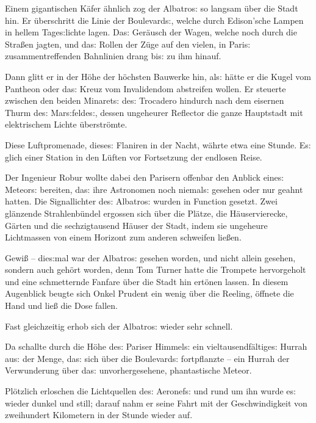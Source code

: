\documentclass[oneside,12pt]{book}
\newcommand{\s}{s:}
\begin{document}
Einem gigantischen K\"afer \"ahnlich zog der
{\glqq}Albatro{\s}{\grqq} so langsam \"uber die Stadt hin. Er
\"uberschritt die Linie der Boulevard{\s}, welche durch Edison'sche
Lampen in hellem Tage{\s}lichte lagen. Da{\s} Ger\"ausch der Wagen,
welche noch durch die Stra{\ss}en jagten, und da{\s} Rollen der
Z\"uge auf den vielen, in Pari{\s} zusammentreffenden Bahnlinien
drang bi{\s} zu ihm hinauf.

Dann glitt er in der H\"ohe der h\"ochsten Bauwerke hin, al{\s}
h\"atte er die Kugel vom Pantheon oder da{\s} Kreuz vom Invalidendom
abstreifen wollen. Er steuerte zwischen den beiden Minaret{\s} de{\s}
Trocadero hindurch nach dem eisernen Thurm de{\s} Mar{\s}felde{\s},
dessen ungeheurer Reflector die ganze Hauptstadt mit elektrischem
Lichte \"uberstr\"omte.

Diese Luftpromenade, diese{\s} Flaniren in der Nacht, w\"ahrte etwa
eine Stunde. E{\s} glich einer Station in den L\"uften vor
Fortsetzung der endlosen Reise.

Der Ingenieur Robur wollte dabei den Parisern offenbar den Anblick
eine{\s} Meteor{\s} bereiten, da{\s} ihre Astronomen noch niemal{\s}
gesehen oder nur geahnt hatten. Die Signallichter de{\s}
{\glqq}Albatro{\s}{\grqq} wurden in Function gesetzt. Zwei
gl\"anzende Strahlenb\"undel ergossen sich \"uber die Pl\"atze, die
H\"auservierecke, G\"arten und die sechzigtausend H\"auser der Stadt,
indem sie ungeheure Lichtmassen von einem Horizont zum anderen
schweifen lie{\ss}en.

Gewi{\ss} -- die{\s}mal war der {\glqq}Albatro{\s}{\grqq} gesehen
worden, und nicht allein gesehen, sondern auch geh\"ort worden, denn
Tom Turner hatte die Trompete hervorgeholt und eine schmetternde
Fanfare \"uber die Stadt hin ert\"onen lassen. In diesem Augenblick
beugte sich Onkel Prudent ein wenig \"uber die Reeling, \"offnete die
Hand und lie{\ss} die Dose fallen.

Fast gleichzeitig erhob sich der {\glqq}Albatro{\s}{\grqq} wieder
sehr schnell.

Da schallte durch die H\"ohe de{\s} Pariser Himmel{\s} ein
vieltausendf\"altige{\s} Hurrah au{\s} der Menge, da{\s} sich \"uber
die Boulevard{\s} fortpflanzte -- ein Hurrah der Verwunderung \"uber
da{\s} unvorhergesehene, phantastische Meteor.

Pl\"otzlich erloschen die Lichtquellen de{\s} Aeronef{\s} und rund um
ihn wurde e{\s} wieder dunkel und still; darauf nahm er seine Fahrt
mit der Geschwindigkeit von zweihundert Kilometern in der Stunde
wieder auf.
\end{document}
